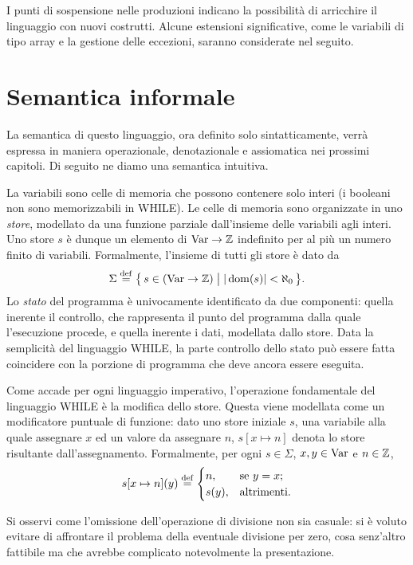 I punti di sospensione nelle produzioni indicano la possibilità di
arricchire il linguaggio con nuovi costrutti.  Alcune estensioni
significative, come le variabili di tipo array e la gestione
delle eccezioni, saranno considerate nel seguito.


\section{Semantica informale} 

La semantica di questo linguaggio, ora definito solo sintatticamente,
verrà espressa in maniera operazionale, denotazionale e assiomatica
nei prossimi capitoli. Di seguito ne diamo una semantica
intuitiva.

La variabili sono celle di memoria che possono contenere solo interi
(i booleani non sono memorizzabili in WHILE).
Le celle di memoria sono organizzate in uno \emph{store},
modellato da una funzione parziale dall'insieme delle variabili
agli interi.  Uno store $s$ è dunque un elemento di $\mathrm{Var} \rightarrow \mathbb{Z}$
indefinito per al più un numero finito di variabili.
Formalmente, l'insieme di tutti gli store è dato da
\[
  \Sigma \defeq \bigl\{\,
                  s \in (\Var \rightarrow \Zset)
                \bigm|
                  |\dom(s)| < \aleph_0
                \,\bigr\}.
\]
Lo \emph{stato} del programma è univocamente identificato da due componenti:
quella inerente il controllo, che rappresenta il punto del programma
dalla quale l'esecuzione procede, e quella inerente i dati, modellata
dallo store.  Data la semplicità del linguaggio WHILE, la parte controllo
dello stato può essere fatta coincidere con la porzione di programma
che deve ancora essere eseguita.

Come accade per ogni linguaggio imperativo, l'operazione fondamentale
del linguaggio WHILE è la modifica dello store.  Questa viene modellata
come un modificatore puntuale di funzione: dato uno store iniziale $s$,
una variabile alla quale assegnare $x$ ed un valore da assegnare $n$,
$s[x \mapsto n]$ denota lo store risultante dall'assegnamento.
Formalmente, per ogni $s \in \Sigma$, $x, y \in \mathrm{Var}$ e $n \in \mathbb{Z}$,
\[
  s[x \mapsto n](y)
    \defeq
      \begin{cases}
        n,    &\text{se $y = x$;} \\
        s(y), &\text{altrimenti.}
      \end{cases}
\]

Si osservi come l'omissione dell'operazione di divisione non sia casuale:
si è voluto evitare di affrontare il problema della eventuale divisione
per zero, cosa senz'altro fattibile ma che avrebbe complicato notevolmente
la presentazione.

